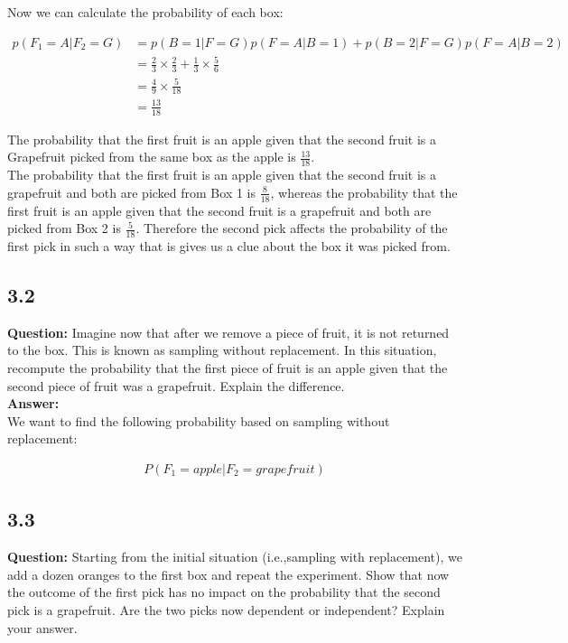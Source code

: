 \documentclass[a4paper]{article}
\begin{document}
Now we can calculate the probability of each box:

\begin{align*}
	p(F_1 = A | F_2 = G) &= p(B = 1| F = G)p(F = A | B = 1) + p(B = 2 | F = G)p(F = A | B = 2)\\
	&= \frac{2}{3} \times \frac{2}{3} +  \frac{1}{3} \times \frac{5}{6}	\\
	&= \frac{4}{9} \times \frac{5}{18}\\
	&= \frac{13}{18}
\end{align*}

The probability that the first fruit is an apple given that the second fruit is a Grapefruit picked from the same box as the apple is $\frac{13}{18}$.\\
The probability that the first fruit is an apple given that the second fruit is a grapefruit and both are picked from Box 1 is $\frac{8}{18}$, whereas the probability that the first fruit is an apple given that the second fruit is a grapefruit and both are picked from Box 2 is $\frac{5}{18}$. Therefore the second pick affects the probability of the first pick in such a way that is gives us a clue about the box it was picked from.

\subsection*{3.2}


\textbf{Question:} Imagine now that after we remove a piece of fruit, it is not returned to the box. This is known as sampling without replacement. In this situation, recompute the probability that the first piece of fruit is an apple given that the second piece of fruit was a grapefruit. Explain the difference.\\

\textbf{Answer:}\\

We want to find the following probability based on sampling without replacement:

\begin{align*}
	P(F_1 = apple | F_2 = grapefruit)
\end{align*}


\subsection*{3.3}

\textbf{Question:} Starting from the initial situation (i.e.,sampling with replacement), we add a dozen oranges to the first box and repeat the experiment. Show that now the outcome of the first pick has no impact on the probability that the second pick is a grapefruit. Are the two picks now dependent or independent? Explain your answer.\\
\end{document}

